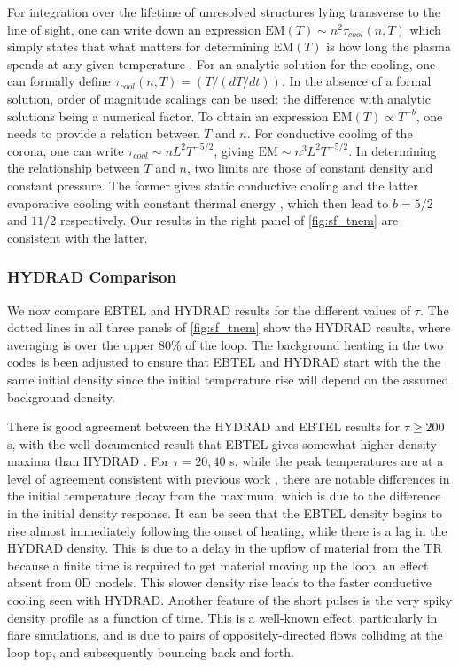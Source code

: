 \documentclass[apj]{emulateapj}
\begin{document}
		\par For integration over the lifetime of unresolved structures lying transverse to the line of sight, one can write down an expression $\mathrm{EM}(T) \sim n^2\tau_{cool}(n, T)$ which simply states that what matters for determining $\mathrm{EM}(T)$ is how long the plasma spends at any given temperature \citep[e.g.][]{cargill_implications_1994,cargill_nanoflare_2004}. For an analytic solution for the cooling, one can formally define $\tau_{cool}(n, T) = (T/(dT/dt))$. In the absence of a formal solution, order of magnitude scalings can be used: the difference with analytic solutions being a numerical factor. To obtain an expression $\mathrm{EM}(T)\propto T^{-b}$, one needs to provide a relation between $T$ and $n$. For conductive cooling of the corona, one can write $\tau_{cool} \sim nL^2T^{-5/2}$, giving $\mathrm{EM} \sim n^3L^2T^{-5/2}$. In determining the relationship between $T$ and $n$, two limits are those of constant density and constant pressure. The former gives static conductive cooling \citep[e.g.][]{antiochos_influence_1976} and the latter evaporative cooling with constant thermal energy \citep[e.g.][]{antiochos_evaporative_1978}, which then lead to $b = 5/2$ and $11/2$ respectively. Our results in the right panel of \autoref{fig:sf_tnem} are consistent with the latter.
	\subsubsection{HYDRAD Comparison}
	\label{subsubsec:hydrad_compare}
	\par We now compare EBTEL and HYDRAD results for the different values of $\tau$. The dotted lines in all three panels of \autoref{fig:sf_tnem} show the HYDRAD results, where averaging is over the upper 80\% of the loop. The background heating in the two codes is been adjusted to ensure that EBTEL and HYDRAD start with the the same initial density since the initial temperature rise will depend on the assumed background density.
	\par There is good agreement between the HYDRAD and EBTEL results for $\tau\ge200$ s, with the well-documented result that EBTEL gives somewhat higher density maxima than HYDRAD \citep[see][]{cargill_enthalpy-based_2012}. For $\tau=20,40$ s, while the peak temperatures are at a level of agreement consistent with previous work \citep{cargill_enthalpy-based_2012}, there are notable differences in the initial temperature decay from the maximum, which is due to the difference in the initial density response. It can be seen that the EBTEL density begins to rise almost immediately following the onset of heating, while there is a lag in the HYDRAD density. This is due to a delay in the upflow of material from the TR because a finite time is required to get material moving up the loop, an effect absent from 0D models. This slower density rise leads to the faster conductive cooling seen with HYDRAD. Another feature of the short pulses is the very spiky density profile as a function of time. This is a well-known effect, particularly in flare simulations, and is due to pairs of oppositely-directed flows colliding at the loop top, and subsequently bouncing back and forth.  
	
\end{document}
